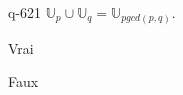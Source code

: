 \begin{truefalse}{q-621}
$\mathbb U_p \cup  \mathbb U_q=\mathbb U_{pgcd(p,q)}$.
\item Vrai
\item* Faux
\end{truefalse}

